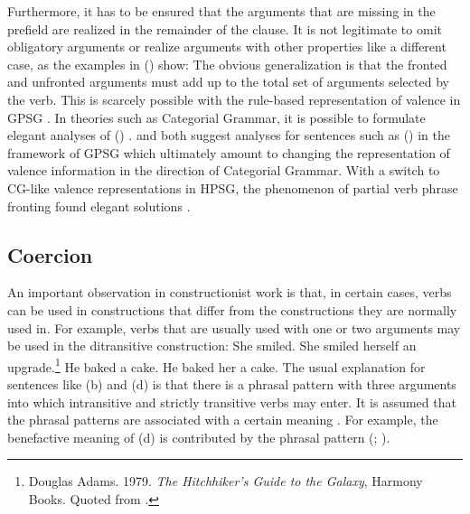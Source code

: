 \documentclass[output=paper,biblatex,babelshorthands,newtxmath,draftmode,colorlinks,citecolor=brown]{langscibook}
\begin{document}
Furthermore, it has to be ensured that the arguments that are
missing in the prefield are realized in the remainder of the clause. It is not legitimate to omit
obligatory arguments or realize arguments with other properties like a different case, as the
examples in () show:
\eal
{}
\zl
The obvious generalization is that the fronted and unfronted arguments must add up to the total
set of arguments selected by the verb. This is scarcely possible with the rule-based
representation of valence in GPSG \citep{Nerbonne86a,Johnson86a}. In theories such as Categorial
Grammar\indexcg, it is possible to formulate elegant analyses of ()
\citep{Geach70a}. \citet{Nerbonne86a} and \citet{Johnson86a} both suggest analyses for sentences
such as () in the framework of GPSG which
ultimately amount to changing the representation of valence information in the direction of
Categorial Grammar.
With a switch to CG-like valence representations in HPSG, the phenomenon of partial verb phrase
fronting found elegant solutions
\parencites[Section~4]{HoehleSpuren}{Mueller96a}{Meurers99a}.


\subsection{Coercion}
\label{sec-coercion}

An important observation in constructionist work is that, in certain cases, verbs can be used in
constructions that differ from the constructions they are normally used in. For example, verbs that are usually
used with one or two arguments may be used in the ditransitive construction:
\eal
\ex She smiled.
\ex She smiled herself an upgrade.\footnote{
Douglas Adams. 1979. \emph{The Hitchhiker’s Guide to the Galaxy}, Harmony Books. Quoted from
.
}
\ex He baked a cake.
\ex He baked her a cake.
\zl
The usual explanation for sentences like (b) and (d) is that there is a phrasal
pattern with three arguments into which intransitive and strictly transitive verbs may enter. It is
assumed that the phrasal patterns are associated with a certain meaning
\citep{Goldberg96a,GJ2004a}. For example, the benefactive meaning of (d) is contributed by
the phrasal pattern (\citealt[Section~6]{Goldberg96a}; \citealt*[]{AGT2014a}).
\end{document}
